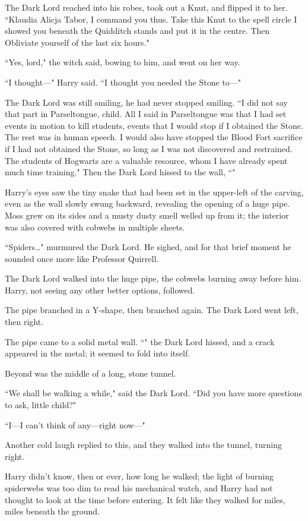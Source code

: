The Dark Lord reached into his robes, took out a Knut, and flipped it to her. ``Klaudia Alicja Tabor, I command you thus. Take this Knut to the spell circle I showed you beneath the Quidditch stands and put it in the centre. Then Obliviate yourself of the last six hours."

``Yes, lord," the witch said, bowing to him, and went on her way.

``I thought—" Harry said. ``I thought you needed the Stone to—"

The Dark Lord was still smiling, he had never stopped smiling. ``I did not say that part in Parseltongue, child. All I said in Parseltongue was that I had set events in motion to kill students, events that I would stop if I obtained the Stone. The rest was in human speech. I would also have stopped the Blood Fort sacrifice if I had not obtained the Stone, so long as I was not discovered and restrained. The students of Hogwarts are a valuable resource, whom I have already spent much time training." Then the Dark Lord hissed to the wall, ``"

Harry's eyes saw the tiny snake that had been set in the upper-left of the carving, even as the wall slowly swung backward, revealing the opening of a huge pipe. Moss grew on its sides and a musty dusty smell welled up from it; the interior was also covered with cobwebs in multiple sheets.

``Spiders{\ldots}" murmured the Dark Lord. He sighed, and for that brief moment he sounded once more like Professor Quirrell.

The Dark Lord walked into the huge pipe, the cobwebs burning away before him. Harry, not seeing any other better options, followed.

The pipe branched in a Y-shape, then branched again. The Dark Lord went left, then right.

The pipe came to a solid metal wall. ``" the Dark Lord hissed, and a crack appeared in the metal; it seemed to fold into itself.

Beyond was the middle of a long, stone tunnel.

``We shall be walking a while," said the Dark Lord. ``Did you have more questions to ask, little child?"

``I—I can't think of any—right now—"

Another cold laugh replied to this, and they walked into the tunnel, turning right.

Harry didn't know, then or ever, how long he walked; the light of burning spiderwebs was too dim to read his mechanical watch, and Harry had not thought to look at the time before entering. It felt like they walked for miles, miles beneath the ground.

